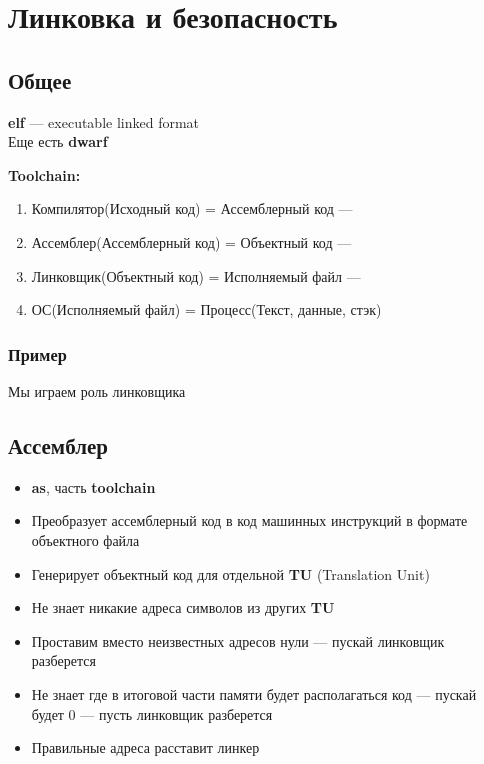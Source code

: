 \documentclass[../../lectures.tex]{subfiles}
\begin{document}
\chapter{Линковка и безопасность}

\section{Общее}
\textbf{elf} --- executable linked format\\
Еще есть \textbf{dwarf}

\textbf{Toolchain:}
\begin{enumerate}
    \item Компилятор(Исходный код) = Ассемблерный код --- 
    \item Ассемблер(Ассемблерный код) = Объектный код --- 
    \item Линковщик(Объектный код) = Исполняемый файл --- 
    \item ОС(Исполняемый файл) = Процесс(Текст, данные, стэк)
\end{enumerate}

\subsection{Пример}
Мы играем роль линковщика

\section{Ассемблер}
\begin{itemize}
    \item \textbf{as}, часть \textbf{toolchain}
    \item Преобразует ассемблерный код в код машинных инструкций в формате объектного файла
    \item Генерирует объектный код для отдельной \textbf{TU} (Translation Unit)
    \item Не знает никакие адреса символов из других \textbf{TU}
    \item Проставим вместо неизвестных адресов нули --- пускай линковщик разберется
    \item Не знает где в итоговой части памяти будет располагаться код --- пускай будет 0 --- пусть линковщик разберется
    \item Правильные адреса расставит линкер
\end{itemize}
\end{document}
